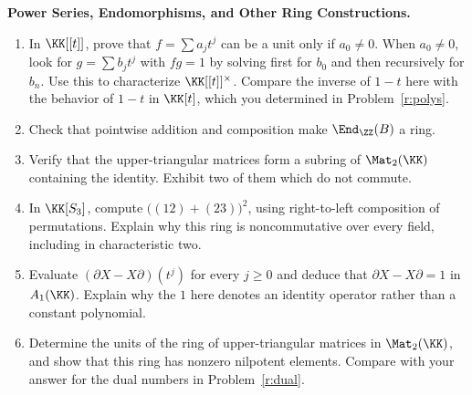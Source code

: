 \documentclass[12pt,reqno]{amsart}
\begin{document}
 
\begin{problems}
\item\label{r:further} \textbf{Power Series, Endomorphisms, and Other Ring Constructions.}
\begin{enumerate}
\item In $\KK[[t]]$, prove that $f=\sum a_jt^j$ can be a unit only if $a_0\ne0$. When $a_0\ne0$, look for $g=\sum b_jt^j$ with $fg=1$ by solving first for $b_0$ and then recursively for $b_n$. Use this to characterize $\KK[[t]]^\times$. Compare the inverse of $1-t$ here with the behavior of $1-t$ in $\KK[t]$, which you determined in Problem~\ref{r:polys}.
\item Check that pointwise addition and composition make $\End_{\ZZ}(B)$ a ring.
\item Verify that the upper-triangular matrices form a subring of $\Mat_2(\KK)$ containing the identity. Exhibit two of them which do not commute.
\item In $\KK[S_3]$, compute $\big((12)+(23)\big)^2$, using right-to-left composition of permutations. Explain why this ring is noncommutative over every field, including in characteristic two.
\item Evaluate $(\partial X-X\partial)(t^j)$ for every $j\geq0$ and deduce that $\partial X-X\partial=1$ in $A_1(\KK)$. Explain why the $1$ here denotes an identity operator rather than a constant polynomial.
\item Determine the units of the ring of upper-triangular matrices in $\Mat_2(\KK)$, and show that this ring has nonzero nilpotent elements. Compare with your answer for the dual numbers in Problem~\ref{r:dual}.
\end{enumerate}
\end{problems}
 
\hrulefill
 

 
\end{document}

